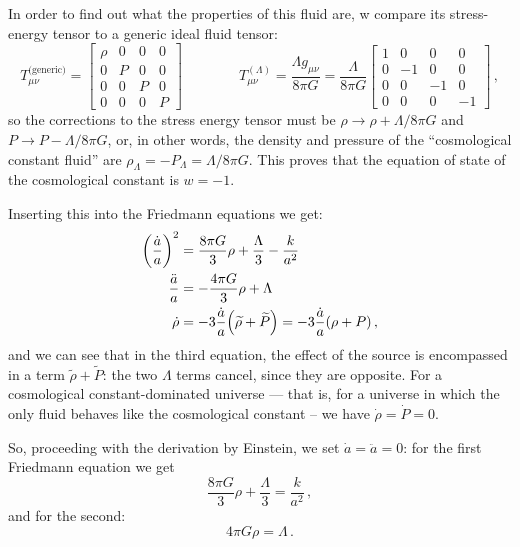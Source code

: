 \documentclass[main.tex]{subfiles}
\begin{document}
In order to find out what the properties of this fluid are, w compare its stress-energy tensor to a generic ideal fluid tensor: 
%
\begin{equation}
T_{\mu \nu }^{\text{(generic)}} = \left[\begin{array}{cccc}
\rho & 0 & 0 & 0 \\ 
0 & P & 0 & 0 \\ 
0 & 0 & P & 0 \\ 
0 & 0 & 0 & P
\end{array}\right]
\qquad \qquad
T^{(\Lambda )}_{\mu \nu } = \frac{\Lambda g_{\mu \nu }}{8 \pi G} = \frac{\Lambda}{8 \pi G} \left[\begin{array}{cccc}
1 & 0 & 0 & 0 \\ 
0 & -1 & 0 & 0 \\ 
0 & 0 & -1 & 0 \\ 
0 & 0 & 0 & -1
\end{array}\right]
\,,
\end{equation}
%
so the corrections to the stress energy tensor must be \(\rho \rightarrow \rho + \Lambda/ 8 \pi G \) and \(P \rightarrow P - \Lambda  / 8 \pi G\), or, in other words, the density and pressure of the ``cosmological constant fluid'' are \(\rho_{\Lambda } = - P_{\Lambda } = \Lambda/8\pi G\).
This proves that the equation of state of the cosmological constant is \(w = -1\).

Inserting this into the Friedmann equations we get: 
%
\begin{align}
  \qty(\frac{\dot{a} }{a})^2 &= 
  \frac{8 \pi G}{3} \rho + \frac{\Lambda }{3}
  - \frac{k}{a^2} \label{eq:friedmann-1-cosmological-constant}\\
  \frac{\ddot{a}}{a}  &= - \frac{4 \pi G}{3} \rho + \Lambda \label{eq:friedmann-2-cosmological-constant}\\
 \dot{\rho} &= -3 \frac{\dot{a}}{a }\qty(\widetilde{\rho} + \widetilde{P}) = -3 \frac{\dot{a}}{a} \qty(\rho + P)\label{eq:friedmann-3-cosmological-constant}
\,,
\end{align}
%
and we can see that in the third equation, the effect of the source is encompassed in a term \(\widetilde{\rho }  + \widetilde{P} \): the two \(\Lambda \) terms cancel, since they are opposite.
For a cosmological constant-dominated universe --- that is, for a universe in which the only fluid behaves like the cosmological constant -- we have \(\dot{\rho} = \dot{P} = 0\). 

So, proceeding with the derivation by Einstein, we set \(\dot{a}= \ddot{a} =0 \): for the first Friedmann equation we get 
%
\begin{equation}
  \frac{8 \pi G}{3} \rho + \frac{\Lambda}{3} = \frac{k}{a^2}
\,,
\end{equation}
%
and for the second: 
%
\begin{equation}
  4 \pi G \rho = \Lambda 
\,.
\end{equation}
\end{document}
